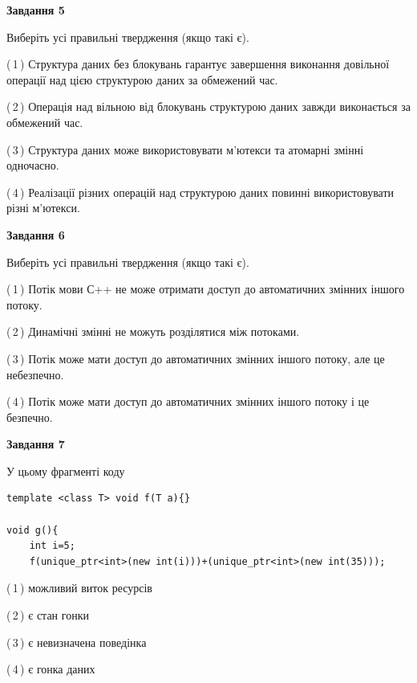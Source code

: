 \documentclass[12pt, ukrainian]{article}
\begin{document}
\begin {large}
{\begin{center}
\textbf{Завдання 5}
\end{center}

Виберіть усі правильні твердження (якщо такі є).\par
\vspace{2mm}

(\,1\,) Структура даних без блокувань гарантує завершення виконання довільної операції над цією структурою даних за обмежений час.%

(\,2\,) Операція над вільною від блокувань структурою даних завжди виконається за обмежений час.%

(\,3\,) Структура даних може використовувати м’ютекси та атомарні змінні одночасно.%

(\,4\,) Реалізації різних операцій над структурою даних повинні використовувати різні м’ютекси.%
\newpage


\begin{center}
\textbf{Завдання 6}
\end{center}

Виберіть усі правильні твердження (якщо такі є).\par
\vspace{2mm}

(\,1\,) Потік мови С++ не може отримати доступ до автоматичних змінних іншого потоку.%

(\,2\,) Динамічні змінні не можуть розділятися між потоками.%

(\,3\,) Потік може мати доступ до автоматичних змінних іншого потоку, але це небезпечно.%

(\,4\,) Потік може мати доступ до автоматичних змінних іншого потоку і це безпечно.%


\begin{center}
\textbf{Завдання 7}
\end{center}

У цьому фрагменті коду
\begin{verbatim}
template <class T> void f(T a){}

void g(){
    int i=5;
    f(unique_ptr<int>(new int(i)))+(unique_ptr<int>(new int(35)));
\end{verbatim}
(\,1\,) можливий виток ресурсів%

(\,2\,) є стан гонки%

(\,3\,) є невизначена поведінка%

(\,4\,) є гонка даних%

}
\end {large}

\vspace{4mm}
\newpage
\end{document}
